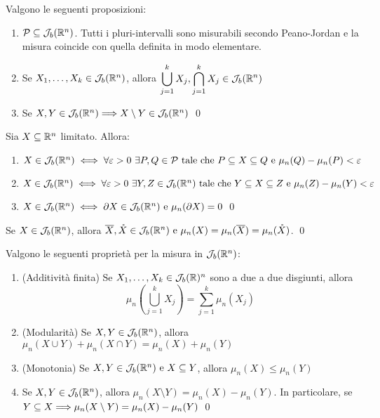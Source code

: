 \begin{lemma} Valgono le seguenti proposizioni:
    \begin{enumerate}
        \item $\mathcal{P} \subseteq \mathcal{J}_b(\mathbb{R}^n)$. Tutti i pluri-intervalli sono misurabili secondo Peano-Jordan e la misura coincide con quella definita in modo elementare.
        \item Se $X_1,\dots,X_k \in \mathcal{J}_b(\mathbb{R}^n)$, allora $\displaystyle\bigcup_{j=1}^k X_j, \bigcap_{j=1}^kX_j \in \mathcal{J}_b(\mathbb{R}^n)$
        \item Se $X,Y \in \mathcal{J}_b(\mathbb{R}^n)\Longrightarrow X \setminus Y \in \mathcal{J}_b(\mathbb{R}^n)$
        \qed
    \end{enumerate}
\end{lemma}

\begin{theorem}
    Sia $X\subseteq \mathbb{R}^n$ limitato. Allora:
    \begin{enumerate}
        \item $X\in \mathcal{J}_b(\mathbb{R}^n) \iff \forall \varepsilon > 0 \ \exists P,Q \in \mathcal{P} \text{ tale che } P \subseteq X \subseteq Q \text{ e } \mu_n(Q)-\mu_n(P) < \varepsilon$
        \item $X \in \mathcal{J}_b(\mathbb{R}^n) \iff \forall \varepsilon > 0 \ \exists Y,Z \in \mathcal{J}_b(\mathbb{R}^n) \text{ tale che } Y \subseteq X \subseteq Z \text{ e } \mu_n(Z)-\mu_n(Y) < \varepsilon$
        \item $X \in \mathcal{J}_b(\mathbb{R}^n)\iff \partial X \in \mathcal{J}_b(\mathbb{R}^n) \text{ e } \mu_n(\partial X)=0$
        \qed
    \end{enumerate}
\end{theorem}

\begin{corollary}
    Se $X \in \mathcal{J}_b(\mathbb{R}^n)$, allora $\overline{X},\mathring X \in \mathcal{J}_b(\mathbb{R}^n) \text{ e } \mu_n(X)=\mu_n(\overline{X})=\mu_n(\mathring X)$.
    \qed
\end{corollary}

\begin{theorem}
    [Proprietà di $\J_b(\R^n)$]
    Valgono le seguenti proprietà per la misura in $\J_b(\R^n)$:
    \begin{enumerate}
        \item (Additività finita) Se $X_1,\dots,X_k \in \mathcal{J}_b(\mathbb{R})^n$ sono a due a due disgiunti, allora
        $$
            \mu_n\left(\displaystyle \bigcup_{j=1}^kX_j\right) =   \displaystyle\sum_{j=1}^k\mu_n(X_j)
        $$
        \item (Modularità) Se $X,Y \in \mathcal{J}_b(\mathbb{R}^n)$, allora $\mu_n(X\cup Y)+\mu_n(X\cap Y)=\mu_n(X)+\mu_n(Y)$
        \item (Monotonia) Se $X,Y \in \mathcal{J}_b(\mathbb{R}^n) \text{ e } X \subseteq Y$, allora $\mu_n(X) \leq \mu_n(Y)$
        \item Se $X,Y \in \mathcal{J}_b(\mathbb{R}^n)$, allora $\mu_n(X\setminus Y)=\mu_n(X)-\mu_n(Y)$. In particolare, se $Y \subseteq X \Longrightarrow \mu_n (X \setminus Y)=\mu_n(X)-\mu_n(Y)$
        \qed
    \end{enumerate}
\end{theorem}

